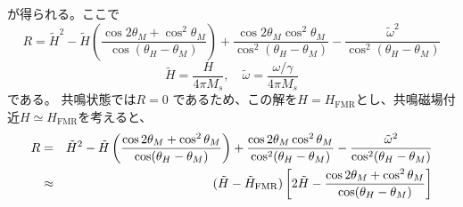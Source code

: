 が得られる。ここで
\begin{equation}
R=\tilde H^2  - \tilde H\left( {\dfrac{{\cos 2\theta_M  + \cos ^2 \theta_M }}{{\cos (\theta_H  - \theta_M )}}} \right) + \dfrac{{\cos 2\theta_M \cos ^2 \theta_M }}{{\cos ^2 (\theta_H  - \theta_M )}} - \dfrac{{\tilde \omega ^2 }}{{\cos ^2 (\theta_H  - \theta_M )}} 
\end{equation}
\begin{equation}
\tilde H = \frac{H}{{4\pi M_s }},\quad \tilde \omega  = \frac{{\omega /\gamma }}{{4\pi M_s }}
\end{equation}
である。
共鳴状態では$R=0$
であるため、この解を$H=H_\text{FMR}$とし、共鳴磁場付近$H\simeq H_\text{FMR}$を考えると、
\begin{eqnarray}
R&=&\tilde H^2 - \tilde H\left( {\dfrac{{\cos 2\theta_M  + \cos ^2 \theta_M }}{{\cos (\theta_H  - \theta_M )}}} \right) + \dfrac{{\cos 2\theta_M \cos ^2 \theta_M }}{{\cos ^2 (\theta_H  - \theta_M )}} - \dfrac{{\tilde \omega ^2 }}{{\cos ^2 (\theta_H  - \theta_M )}} \nonumber\\
&\approx&  (\tilde H - \tilde H_{{\rm{FMR}}} )\left[ {2\tilde H  - {\frac{{\cos 2\theta_M  +\cos ^2 \theta_M }}{{\cos (\theta_H  - \theta_M )}}} } \right] \label{AAA}
\end{eqnarray}
